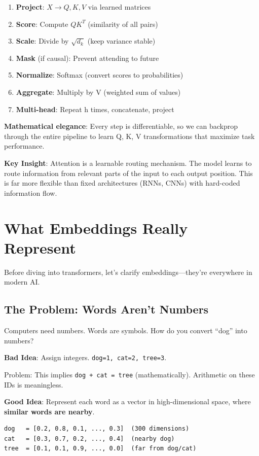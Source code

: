 \begin{enumerate}
\item \textbf{Project}: $X \to Q, K, V$ via learned matrices
\item \textbf{Score}: Compute $QK^T$ (similarity of all pairs)
\item \textbf{Scale}: Divide by $\sqrt{d_k}$ (keep variance stable)
\item \textbf{Mask} (if causal): Prevent attending to future
\item \textbf{Normalize}: Softmax (convert scores to probabilities)
\item \textbf{Aggregate}: Multiply by V (weighted sum of values)
\item \textbf{Multi-head}: Repeat h times, concatenate, project
\end{enumerate}

\textbf{Mathematical elegance}: Every step is differentiable, so we can backprop through the entire pipeline to learn Q, K, V transformations that maximize task performance.

\textbf{Key Insight}: Attention is a learnable routing mechanism. The model learns to route information from relevant parts of the input to each output position. This is far more flexible than fixed architectures (RNNs, CNNs) with hard-coded information flow.

\section{What Embeddings Really Represent}

Before diving into transformers, let's clarify embeddings---they're everywhere in modern AI.

\subsection{The Problem: Words Aren't Numbers}

Computers need numbers. Words are symbols. How do you convert ``dog'' into numbers?

\textbf{Bad Idea}: Assign integers. \texttt{dog=1, cat=2, tree=3}.

Problem: This implies \texttt{dog + cat = tree} (mathematically). Arithmetic on these IDs is meaningless.

\textbf{Good Idea}: Represent each word as a vector in high-dimensional space, where \textbf{similar words are nearby}.

\begin{verbatim}
dog   = [0.2, 0.8, 0.1, ..., 0.3]  (300 dimensions)
cat   = [0.3, 0.7, 0.2, ..., 0.4]  (nearby dog)
tree  = [0.1, 0.1, 0.9, ..., 0.0]  (far from dog/cat)
\end{verbatim}

